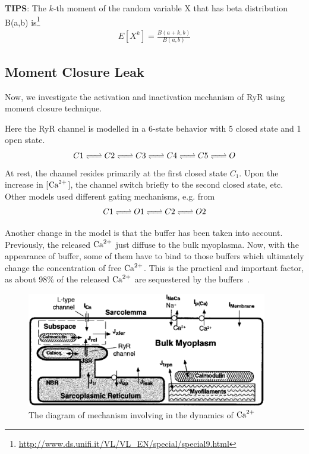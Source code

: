 {\bf TIPS}: The $k$-th moment of the random variable X that has beta
distribution B(a,b) is\footnote{\url{http://www.ds.unifi.it/VL/VL_EN/special/special9.html}}
\begin{eqnarray}
  \label{eq:251}
  E[X^k] = \frac{B(a+k,b)}{B(a,b)}
\end{eqnarray}



\subsection{Moment Closure Leak}
\label{sec:moment-closure-leak}

Now, we investigate the activation and inactivation mechanism of RyR
using moment closure technique. 

Here the RyR channel is modelled in a 6-state behavior with 5 closed
state and 1 open state. 
\begin{equation}
  \label{eq:242}
  C1 \ce{<=>} C2 \ce{<=>} C3 \ce{<=>} C4 \ce{<=>} C5 \ce{<=>} O
\end{equation}
At rest, the channel resides primarily at the first closed state
$C_1$. Upon the increase in [${\text{Ca}^{2+}}$], the channel switch briefly
to the second closed state, etc. Other models used different gating
mechanisms, e.g. from ~\citep{jafri1998cad}
\begin{equation}
  \label{eq:244}
  C1 \ce{<=>} O1 \ce{<=>} C2 \ce{<=>} O2
\end{equation}

Another change in the model is that the buffer has been taken into
account. Previously, the released ${\text{Ca}^{2+}}$ just diffuse to the bulk
myoplasma. Now, with the appearance of buffer, some of them have to
bind to those buffers which ultimately change the concentration of
free ${\text{Ca}^{2+}}$. This is the practical and important factor, as about
98\% of the released ${\text{Ca}^{2+}}$ are sequestered by the
buffers~\citep{berlin1994iccb}.
\begin{figure}[hbt]
  \centerline{\includegraphics[height=5cm]{./images/buffer_myocyte_diagram.eps}}
  \caption{The diagram of mechanism involving in the dynamics of ${\text{Ca}^{2+}}$}
  \label{fig:buffer_Ca}
\end{figure}


